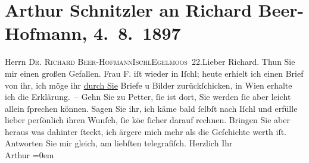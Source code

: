 

         
         \renewcommand{\erwaehntePersonen}{Personen: Richard Beer-Hofmann, Rosa Freudenthal}
         \renewcommand{\erwaehnteOrte}{Orte: Bad Ischl, Eglmoosgasse, Hotel und Pension Rudolfshöhe (Leopold Petter), IX., Alsergrund, Wien}
         \renewcommand{\erwaehnteWerke}{}
               \section[Arthur Schnitzler an Richard Beer-Hofmann, 4. 8. 1897]{ Arthur Schnitzler an Richard Beer-Hofmann, 4. 8. 1897}\nopagebreak{}\rehead{ }\begin{ledgroupsized}[t]{13cm}\normalsize\beginnumbering{} \toendnotes[C]{\smallbreak\pagebreak[2]} 
\toendnotes[C]{\smallbreak}\pstart{}{\pb}Herrn \textsc{Dr. Richard
                     Beer-Hofmann}\pend{}\pstart{}\textsc{Ischl}\pend{}\pstart{}\textsc{Egelmoos 22}.\pend{}{\bigskip}\pstart{}{\pb}Lieber Richard.\pend\pstart
           Thun Sie mir einen großen Gefallen.\pend
           \pstart
           Frau F. iſt wieder in Iſchl; heute erhielt ich einen Brief von ihr, ich möge ihr \uline{durch Sie} Briefe u Bilder zurückſchicken, in Wien erhalte ich die Erklärung. – Gehn Sie zu {\pb}Petter, ſie ist \label{K_L00712-1v}\label{K_L00712-1h} dort, Sie werden ſie aber leicht allein ſprechen können. Sagen Sie
               ihr, ich käme bald ſelbſt nach Iſchl und erfülle
               lieber perſönlich ihren Wunſch, ſie kö{\geminationn}e ſicher darauf
               rechnen. {\pb}Bringen Sie aber heraus was dahinter ſteckt,
               ich ärgere mich mehr als die Geſchichte werth iſt. Antworten Sie mir gleich, am
               liebſten telegrafiſch.\pend
           \pstart
           Herzlich Ihr{\\[\baselineskip]}\spacefill\mbox{Arthur}\pend
           \leftskip=0em{}
         

\end{ledgroupsized}
